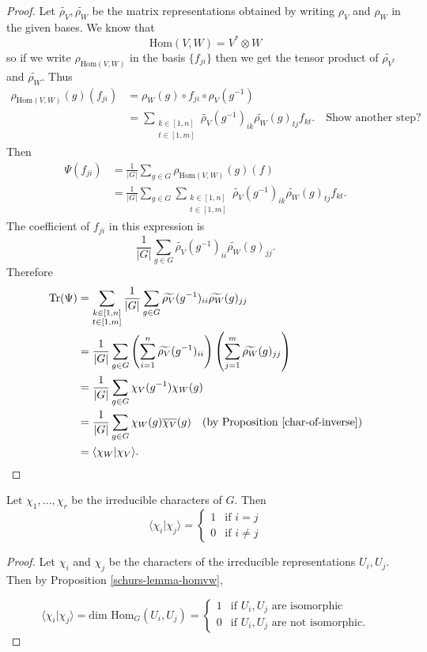 \begin{proof}
Let $\widetilde{\rho_V}, \widetilde{\rho_W}$ be the matrix representations obtained by writing $\rho_V$ and $\rho_W$ in the given bases.  We know that 
\[ \text{Hom}(V,W) = V^* \otimes W \]
so if we write $\rho_{\text{Hom}(V,W)}$ in the basis $\{ f_{ji} \}$ then we get the tensor product of  $\widetilde{\rho_{V^*}}$ and $\widetilde{\rho_W}$.  Thus
\begin{align*}
\rho_{\text{Hom}(V,W)}(g)(f_{ji}) &= \rho_W (g) \circ f_{ji} \circ \rho_V (g^{-1}) \\
&= \sum_{\substack{k \in [1,n] \\  t \in [1,m]}} \widetilde{\rho_V} (g^{-1})_{ik} \widetilde{\rho_W}(g)_{tj} f_{kt}. \quad \text{Show another step?}
\end{align*}
Then 
\begin{align*}
\Psi (f_{ji}) &= \frac{1}{|G|} \sum_{g \in G} \rho_{\text{Hom}(V,W)}(g)(f) \\
&= \frac{1}{|G|} \sum_{g \in G} \sum_{\substack{k \in [1,n] \\  t \in [1,m]}} \widetilde{\rho_V} (g^{-1})_{ik} \widetilde{\rho_W}(g)_{tj} f_{kt}.
\end{align*}
The coefficient of $f_{ji}$ in this expression is
\[ \frac{1}{|G|} \sum_{g \in G}\widetilde{\rho_V} (g^{-1})_{ii} \widetilde{\rho_W}(g)_{jj}. \]
Therefore
\begin{align*}
\text{Tr} (\Psi) &= \sum_{\substack{k \in [1,n] \\  t \in [1,m]}}  \frac{1}{|G|} \sum_{g \in G}\widetilde{\rho_V} (g^{-1})_{ii} \widetilde{\rho_W}(g)_{jj} \\
&=  \frac{1}{|G|} \sum_{g \in G} \left( \sum_{i=1}^n \widetilde{\rho_V}(g^{-1})_{ii} \right) \left( \sum_{j=1}^m \widetilde{\rho_W} (g)_{jj} \right) \\
&= \frac{1}{|G|} \sum_{g \in G} \chi_V (g^{-1}) \chi_W (g) \\
&= \frac{1}{|G|} \sum_{g \in G} \chi_W (g) \overline{\chi_V}(g)  \quad \text{(by Proposition \ref{char-of-inverse})}\\
&= \langle \chi_W | \chi_V \rangle.
\end{align*}
\end{proof}

\begin{cor}\label{inner-product-of-irr-chars}
Let $\chi_1, \ldots, \chi_r$ be the irreducible characters of $G$.  Then
\[ \langle \chi_i | \chi_j \rangle = \begin{cases}  1 &\text{if } i = j \\ 0 &\text{if } i \neq j\end{cases} \]
\end{cor}
\begin{proof}
Let $\chi_i$ and $\chi_j$ be the characters of the irreducible representations $U_i, U_j$.  Then by Proposition \ref{schurs-lemma-homvw},

\[ \langle \chi_i | \chi_j \rangle = \text{dim Hom}_G (U_i, U_j) = \begin{cases}  1 &\text{if }U_i, U_j \text{ are isomorphic} \\  0 &\text{if }U_i, U_j \text{ are not isomorphic}. \end{cases} \]
\end{proof}


